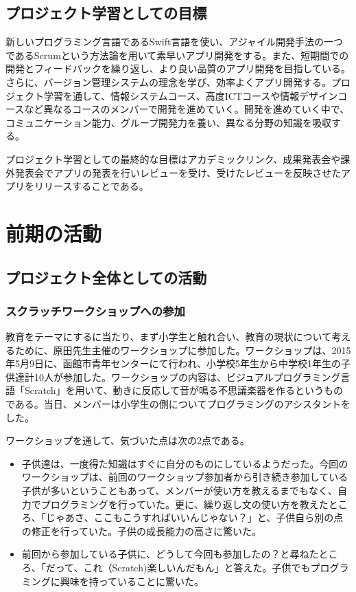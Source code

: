 \documentclass[openany,11pt,papersize]{jsbook}
\begin{document}
\section{プロジェクト学習としての目標}
新しいプログラミング言語であるSwift言語を使い、アジャイル開発手法の一つであるScrumという方法論を用いて素早いアプリ開発をする。また、短期間での開発とフィードバックを繰り返し、より良い品質のアプリ開発を目指している。さらに、バージョン管理システムの理念を学び、効率よくアプリ開発する。プロジェクト学習を通して、情報システムコース、高度ICTコースや情報デザインコースなど異なるコースのメンバーで開発を進めていく。開発を進めていく中で、コミュニケーション能力、グループ開発力を養い、異なる分野の知識を吸収する。
\par
プロジェクト学習としての最終的な目標はアカデミックリンク、成果発表会や課外発表会でアプリの発表を行いレビューを受け、受けたレビューを反映させたアプリをリリースすることである。

\chapter{前期の活動}

\section{プロジェクト全体としての活動}

\subsection{スクラッチワークショップへの参加}
\par 教育をテーマにするに当たり、まず小学生と触れ合い、教育の現状について考えるために、原田先生主催のワークショップに参加した。ワークショップは、2015年5月9日に、函館市青年センターにて行われ、小学校5年生から中学校1年生の子供達計10人が参加した。ワークショップの内容は、ビジュアルプログラミング言語「Scratch」を用いて、動きに反応して音が鳴る不思議楽器を作るというものである。当日、メンバーは小学生の側についてプログラミングのアシスタントをした。
\par ワークショップを通して、気づいた点は次の2点である。
\begin{itemize}
\item 子供達は、一度得た知識はすぐに自分のものにしているようだった。今回のワークショップは、前回のワークショップ参加者から引き続き参加している子供が多いということもあって、メンバーが使い方を教えるまでもなく、自力でプログラミングを行っていた。更に、繰り返し文の使い方を教えたところ、「じゃあさ、ここもこうすればいいんじゃない？」と、子供自ら別の点の修正を行っていた。子供の成長能力の高さに驚いた。
\item 前回から参加している子供に、どうして今回も参加したの？と尋ねたところ、「だって、これ（Scratch)楽しいんだもん」と答えた。子供でもプログラミングに興味を持っていることに驚いた。
\end{itemize}
\end{document}
